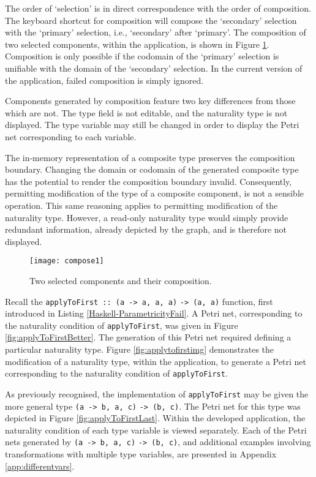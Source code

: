 \documentclass[../Dissertation.tex]{subfiles}
\begin{document}
The order of `selection' is in direct correspondence with the order of composition. The keyboard shortcut for composition will compose the `secondary' selection with the `primary' selection, i.e., `secondary' after `primary'. The composition of two selected components, within the application, is shown in Figure \ref{fig:compose1}. Composition is only possible if the codomain of the `primary' selection is unifiable with the domain of the `secondary' selection. In the current version of the application, failed composition is simply ignored.
\par
Components generated by composition feature two key differences from those which are not. The type field is not editable, and the naturality type is not displayed. The type variable may still be changed in order to display the Petri net corresponding to each variable.
\par 
The in-memory representation of a composite type preserves the composition boundary. Changing the domain or codomain of the generated composite type has the potential to render the composition boundary invalid. Consequently, permitting modification of the type of a composite component, is not a sensible operation. This same reasoning applies to permitting modification of the naturality type. However, a read-only naturality type would simply provide redundant information, already depicted by the graph, and is therefore not displayed.

\begin{figure}[H]
\begin{center}
\texttt{[image: compose1]}
\end{center}
\caption{Two selected components and their composition.}
\label{fig:compose1}
\end{figure}

Recall the \lstinline{applyToFirst :: (a -> a, a, a)} \lstinline{-> (a, a)} function, first introduced in Listing \ref{Haskell-ParametricityFail}. A Petri net, corresponding to the naturality condition of \lstinline{applyToFirst}, was given in Figure \ref{fig:applyToFirstBetter}. The generation of this Petri net required defining a particular naturality type. Figure \ref{fig:applytofirstimg} demonstrates the modification of a naturality type, within the application, to generate a Petri net corresponding to the naturality condition of \lstinline{applyToFirst}. 
\par
As previously recognised, the implementation of \lstinline{applyToFirst} may be given the more general type \lstinline{(a -> b, a, c)}  \lstinline{-> (b, c)}. The Petri net for this type was depicted in Figure \ref{fig:applyToFirstLast}. Within the developed application, the naturality condition of each type variable is viewed separately. Each of the Petri nets generated by \lstinline{(a -> b, a, c)}  \lstinline{-> (b, c)}, and additional examples involving transformations with multiple type variables, are presented in Appendix \ref{app:differentvars}.
\end{document}

